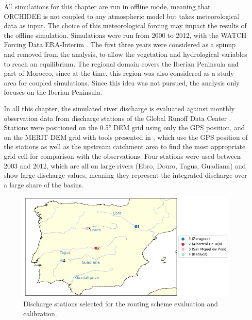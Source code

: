 All simulations for this chapter are run in offline mode, meaning that ORCHIDEE is not coupled to any atmospheric model but takes meteorological data as input. The choice of this meteorological forcing may impact the results of the offline simulation.
Simulations were run from 2000 to 2012, with the WATCH Forcing Data ERA-Interim \citep[WFDEI, ][]{weedon_wfdei_2014}. %
The first three years were considered as a spinup and removed from the analysis, to allow the vegetation and hydrological variables to reach an equilibrium. The regional domain covers the Iberian Peninsula and part of Morocco, since at the time, this region was also considered as a study area for coupled simulations. Since this idea was not pursued, the analysis only focuses on the Iberian Peninsula.

In all this chapter, the simulated river discharge is evaluated against monthly observation data from discharge stations of the Global Runoff Data Center \cite[GRDC, https://grdc.bafg.de,][]{fekete_global_2003}.
Stations were positioned on the 0.5° DEM grid using only the GPS position, and on the MERIT DEM grid with tools presented in \cite{polcher_hydrological_2023}, which use the GPS position of the stations as well as the upstream catchment area to find the most appropriate grid cell for comparison with the observations. 
Four stations were used between 2003 and 2012, which are all on large rivers (Ebro, Douro, Tagus, Guadiana) and show large discharge values, meaning they represent the integrated discharge over a large share of the basins. 

\begin{figure}[htbp]
    \centering
    \includegraphics[width=0.7\linewidth]{images/chap3/river_discharge/halfdeg_4stations_map.png}
    \caption{Discharge stations selected for the routing scheme evaluation and calibration.}
    \label{fig:halfedg_stations_map}
\end{figure}

